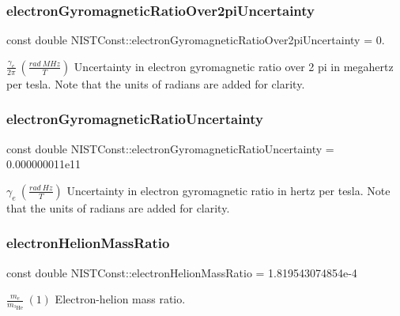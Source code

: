 \subsubsection{\texorpdfstring{electron\+Gyromagnetic\+Ratio\+Over2pi\+Uncertainty}{electronGyromagneticRatioOver2piUncertainty}}
{\footnotesize\ttfamily const double N\+I\+S\+T\+Const\+::electron\+Gyromagnetic\+Ratio\+Over2pi\+Uncertainty = 0.}

$\frac{\gamma_e}{2\pi} \ (\frac{rad\ MHz}{T})$ Uncertainty in electron gyromagnetic ratio over 2 pi in megahertz per tesla. Note that the units of radians are added for clarity. \mbox{\label{group___n_i_s_t_const-_electron_gaca70ad0d6ddcb9cd3f29880a30415db8}} 
\subsubsection{\texorpdfstring{electron\+Gyromagnetic\+Ratio\+Uncertainty}{electronGyromagneticRatioUncertainty}}
{\footnotesize\ttfamily const double N\+I\+S\+T\+Const\+::electron\+Gyromagnetic\+Ratio\+Uncertainty = 0.\+000000011e11}

$\gamma_e \ (\frac{rad\ Hz}{T})$ Uncertainty in electron gyromagnetic ratio in hertz per tesla. Note that the units of radians are added for clarity. \mbox{\label{group___n_i_s_t_const-_electron_ga5039598cd8a51d15d9dfbb0463c109d6}} 
\subsubsection{\texorpdfstring{electron\+Helion\+Mass\+Ratio}{electronHelionMassRatio}}
{\footnotesize\ttfamily const double N\+I\+S\+T\+Const\+::electron\+Helion\+Mass\+Ratio = 1.\+819543074854e-\/4}

$\frac{m_e}{m_{^3\textrm{He}}} \ (1)$ Electron-\/helion mass ratio. \mbox{\label{group___n_i_s_t_const-_electron_ga38d8d37bdbda6d2c1ad4165f56901cdc}} 
